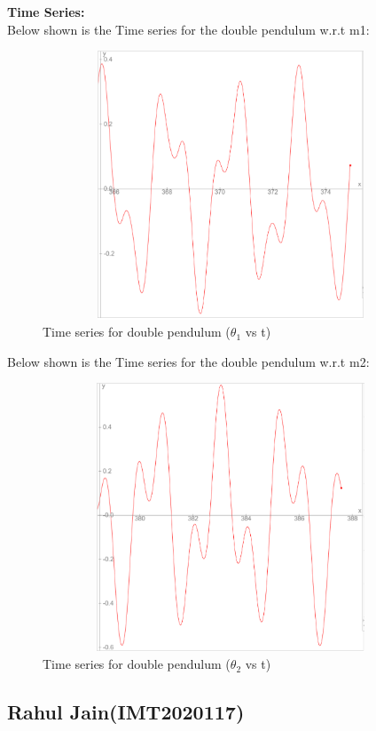 \documentclass[11pt]{scrartcl} %
\begin{document}
\newpage
\textbf{Time Series:}\\
Below shown is the Time series for the double pendulum w.r.t m1:
\begin{figure}[h] %
	\centering
	\includegraphics[width=12cm, height=8cm]{4b_time(1).PNG} %
	\caption{Time series for double pendulum ($\theta_{1}$ vs t)}
\end{figure}

Below shown is the Time series for the double pendulum w.r.t m2:
\begin{figure}[h] %
	\centering
	\includegraphics[width=12cm, height=8cm]{4b_time(2).PNG} %
	\caption{Time series for double pendulum ($\theta_{2}$ vs t)}
\end{figure}




\newpage
\subsection{Rahul Jain(IMT2020117)}
\end{document}
